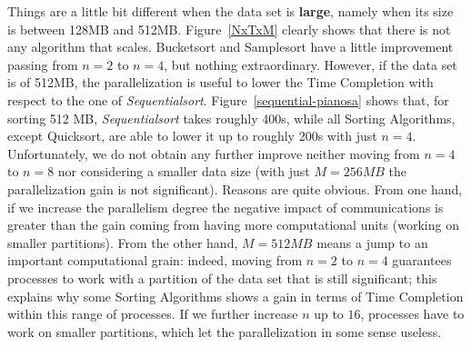 Things are a little bit different when the data set is \textbf{large}, namely when its size is between 128MB and 512MB. Figure~\ref{NxTxM} clearly shows that there is not any algorithm that scales. Bucketsort and Samplesort have a little improvement passing from $n=2$ to $n=4$, but nothing extraordinary. However, if the data set is of 512MB, the parallelization is useful to lower the Time Completion with respect to the one of \textit{Sequentialsort}. Figure~\ref{sequential-pianosa} shows that, for sorting 512 MB, \textit{Sequentialsort} takes roughly 400s, while all Sorting Algorithms, except Quicksort, are able to lower it up to roughly 200s with just $n=4$. Unfortunately, we do not obtain any further improve neither moving from $n=4$ to $n=8$ nor considering a smaller data size (with just $M=256MB$ the parallelization gain is not significant). Reasons are quite obvious. From one hand, if we increase the parallelism degree the negative impact of communications is greater than the gain coming from having more computational units (working on smaller partitions).  From the other hand, $M=512MB$ means a jump to an important computational grain: indeed, moving from $n=2$ to $n=4$ guarantees processes to work with a partition of the data set that is still significant; this explains why some Sorting Algorithms shows a gain in terms of Time Completion within this range of processes. If we further increase $n$ up to $16$, processes have to work on smaller partitions, which let the parallelization in some sense useless.

